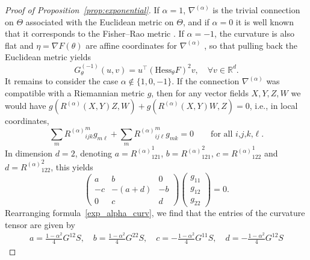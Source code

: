 \documentclass[11pt,reqno]{amsart}
\theoremstyle{definition}
\newcommand{\R}{\mathbb R}
\newcommand{\na}{\nabla^{(\alpha)}}
\begin{document}
\begin{proof}[Proof of Proposition~\ref{prop:exponential}]
If $\alpha=1$, $\na$ is the trivial connection on $\Theta$ associated with the Euclidean metric on $\Theta$, and if $\alpha=0$ it is well known that it corresponds to the Fisher--Rao metric \cite{amari2000methods}. If $\alpha=-1$, the curvature is also flat and $\eta=\nabla F(\theta)$ are affine coordinates for $\na$ \cite{amari2000methods}, so that pulling back the Euclidean metric yields
$$G^{(-1)}_\theta(u, v)=u^\top(\mathrm{Hess}_\theta F)^2 v, \quad \forall v\in\R^d.$$
It remains to consider the case $\alpha \notin\{1,0,-1\}$. If the connection $\nabla^{(\alpha)}$ was compatible with a Riemannian metric $g$, then for any vector fields $X,Y,Z,W$ we would have $g(R^{(\alpha)}(X,Y)Z,W)+g(R^{(\alpha)}(X,Y)W,Z)=0$, i.e., in local coordinates,
\[
\sum_m {R^{(\alpha)}}^m_{ijk}g_{m\ell} + \sum_m {R^{(\alpha)}}^m_{ij\ell} g_{mk} = 0 \qquad \text{for all $i$,$j$,$k$,$\ell$.}
\]
In dimension $d=2$, denoting $a={R^{(\alpha)}}_{121}^1$, $b={R^{(\alpha)}}_{121}^2$, $c={R^{(\alpha)}}_{122}^1$ and $d={R^{(\alpha)}}_{122}^2$, this yields
\begin{equation}\label{compatibility_cond}
\left(\begin{matrix} a & b & 0\\ -c & -(a+d) & -b\\ 0 & c & d\end{matrix}\right)\left(\begin{matrix} g_{11}\\ g_{12}\\ g_{22}\end{matrix}\right)=0.
\end{equation}
Rearranging formula~\eqref{exp_alpha_curv}, we find that the entries of the curvature tensor are given by
\begin{align*}
a=\frac{1-\alpha^2}{4}G^{12}S, \quad b=\frac{1-\alpha^2}{4}G^{22}S, \quad c=-\frac{1-\alpha^2}{4}G^{11}S, \quad d=-\frac{1-\alpha^2}{4}G^{12}S

\end{align*}
\end{proof}
\end{document}
